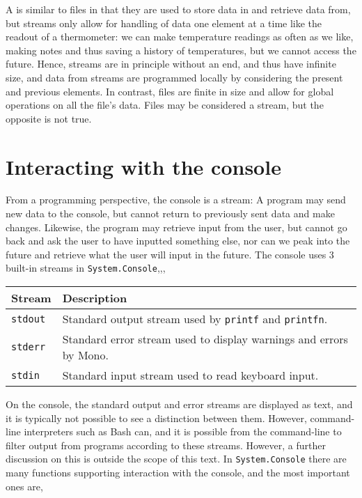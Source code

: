 A  is similar to files in that they are used to store data in and retrieve data from, but streams only allow for handling of data one element at a time like the readout of a thermometer: we can make temperature readings as often as we like, making notes and thus saving a history of temperatures, but we cannot access the future. Hence, streams are in principle without an end, and thus have infinite size, and data from streams are programmed locally by considering the present and previous elements. In contrast, files are finite in size and allow for global operations on all the file's data. Files may be considered a stream, but the opposite is not true.

\section{Interacting with the console}
From a programming perspective, the console is a stream: A program may send new data to the console, but cannot return to previously sent data and make changes. Likewise, the program may retrieve input from the user, but cannot go back and ask the user to have inputted something else, nor can we peak into the future and retrieve what the user will input in the future. The console uses 3 built-in streams in \lstinline!System.Console!,,,
\begin{center}
  \begin{tabularx}{\linewidth}{|l|X|}
    \hline
    \rowcolor{headerRowColor} Stream & Description\\
    \hline
    \lstinline{stdout} & Standard output stream used by \lstinline!printf! and \lstinline!printfn!.\\
    \hline
    \lstinline{stderr} & Standard error stream used to display warnings and errors by Mono.\\
    \hline
    \lstinline{stdin} & Standard input stream used to read keyboard input.\\
    \hline
  \end{tabularx}
\end{center}
On the console, the standard output and error streams are displayed as text, and it is typically not possible to see a distinction between them. However, command-line interpreters such as Bash can, and it is possible from the command-line to filter output from programs according to these streams. However, a further discussion on this is outside the scope of this text. In \lstinline!System.Console! there are many functions supporting interaction with the console, and the most important ones are,
